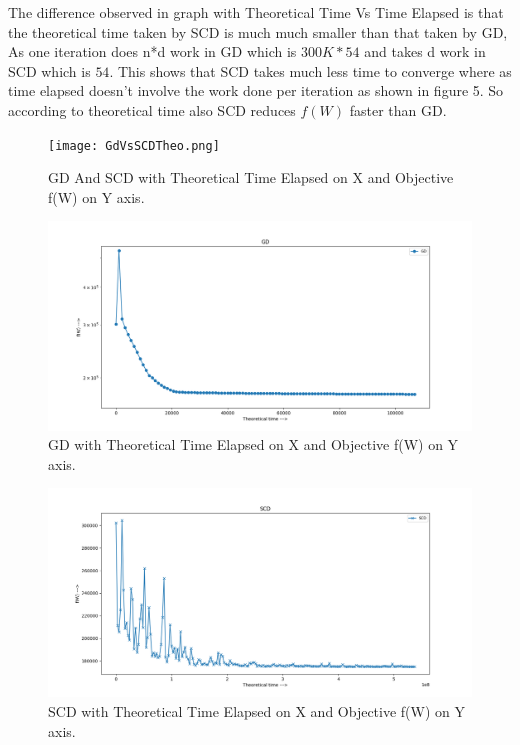 \documentclass[a4paper,11pt]{article}
\begin{document}
\begin{mlsolution}
The difference observed in graph with Theoretical Time Vs Time Elapsed is that the theoretical time taken by SCD is much much smaller than that taken by GD, As one iteration does n*d work in GD which is $300K * 54$ and takes d work in SCD which is $54$. This shows that SCD takes much less time to converge where as time elapsed doesn't involve the work done per iteration as shown in figure 5. So according to theoretical time also SCD reduces $f(W)$ faster than GD.

\begin{figure}[th]%
\centering
\texttt{[image: GdVsSCDTheo.png]}%

\caption{GD And SCD with Theoretical Time Elapsed on X and Objective f(W) on Y axis.}%
\label{fig:GD4}%
\end{figure}

\begin{figure}[th]%
\centering
\includegraphics[width=1.2\columnwidth]{GD-theo.png}%

\caption{GD with Theoretical Time Elapsed on X and Objective f(W) on Y axis.}%
\label{fig:GD2}%
\end{figure}

\begin{figure}[th]%
\centering
\includegraphics[width=1.2\columnwidth]{SCD-theo.png}%

\caption{SCD with Theoretical Time Elapsed on X and Objective f(W) on Y axis.}%
\label{fig:SCD2}%
\end{figure}

\end{mlsolution}
          
\end{document}
